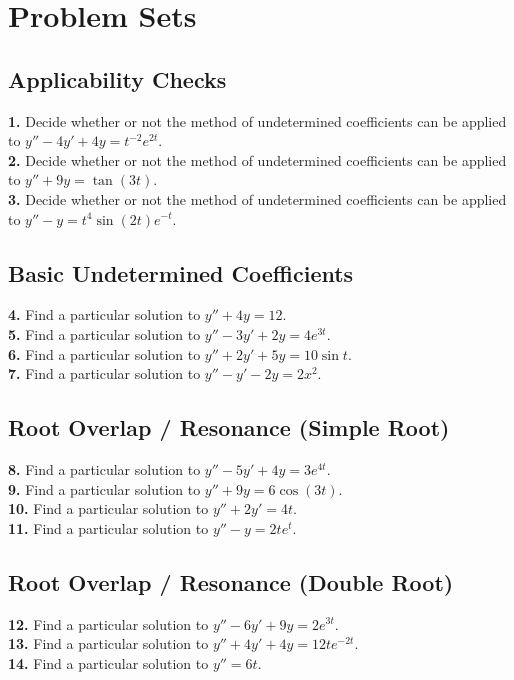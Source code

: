 \documentclass[11pt]{article}
\begin{document}
\newpage

\section{Problem Sets}

\subsection*{Applicability Checks}
\textbf{1.} Decide whether or not the method of undetermined coefficients can be applied to $y'' - 4y' + 4y = t^{-2}e^{2t}$. \\
\textbf{2.} Decide whether or not the method of undetermined coefficients can be applied to $y'' + 9y = \tan(3t)$. \\
\textbf{3.} Decide whether or not the method of undetermined coefficients can be applied to $y'' - y = t^4 \sin(2t) e^{-t}$.

\subsection*{Basic Undetermined Coefficients}
\textbf{4.} Find a particular solution to $y'' + 4y = 12$. \\
\textbf{5.} Find a particular solution to $y'' - 3y' + 2y = 4e^{3t}$. \\
\textbf{6.} Find a particular solution to $y'' + 2y' + 5y = 10\sin t$. \\
\textbf{7.} Find a particular solution to $y'' - y' - 2y = 2x^2$.

\subsection*{Root Overlap / Resonance (Simple Root)}
\textbf{8.} Find a particular solution to $y'' - 5y' + 4y = 3e^{4t}$. \\
\textbf{9.} Find a particular solution to $y'' + 9y = 6\cos(3t)$. \\
\textbf{10.} Find a particular solution to $y'' + 2y' = 4t$. \\
\textbf{11.} Find a particular solution to $y'' - y = 2te^t$.

\subsection*{Root Overlap / Resonance (Double Root)}
\textbf{12.} Find a particular solution to $y'' - 6y' + 9y = 2e^{3t}$. \\
\textbf{13.} Find a particular solution to $y'' + 4y' + 4y = 12te^{-2t}$. \\
\textbf{14.} Find a particular solution to $y'' = 6t$.
\end{document}

